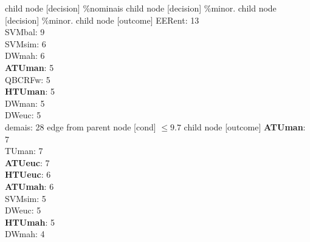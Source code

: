 child {node [decision] {\%nominais}
child {node [decision] {\%minor.}
child {node [decision] {\%minor.}
child {node [outcome] {
EERent: 13\\
SVMbal: 9\\
SVMsim: 6\\
DWmah: 6\\
\textbf{ATUman}: 5\\
QBCRFw: 5\\
\textbf{HTUman}: 5\\
DWman: 5\\
DWeuc: 5\\
demais: 28} edge from parent node [cond] {$\leq9.7$}}
child {node [outcome] {
\textbf{ATUman}: 7\\
TUman: 7\\
\textbf{ATUeuc}: 7\\
\textbf{HTUeuc}: 6\\
\textbf{ATUmah}: 6\\
SVMsim: 5\\
DWeuc: 5\\
\textbf{HTUmah}: 5\\
DWmah: 4\\
}}}}}
